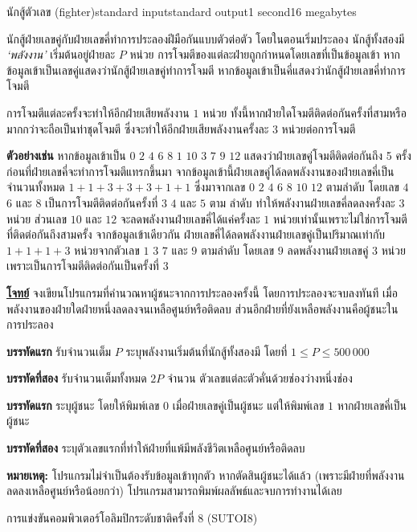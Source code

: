 \documentclass[11pt,a4paper]{article}
\begin{document}
\begin{problem}{นักสู้ตัวเลข (fighter)}{standard input}{standard output}{1 second}{16 megabytes}

นักสู้ฝ่ายเลขคู่กับฝ่ายเลขคี่ทำการประลองฝีมือกันแบบตัวต่อตัว โดยในตอนเริ่มประลอง นักสู้ทั้งสองมี \textit{‘พลังงาน’} เริ่มต้นอยู่ฝ่ายละ $P$ หน่วย การโจมตีของแต่ละฝ่ายถูกกำหนดโดยเลขที่เป็นข้อมูลเข้า หากข้อมูลเข้าเป็นเลขคู่แสดงว่านักสู้ฝ่ายเลขคู่ทำการโจมตี หากข้อมูลเข้าเป็นคี่แสดงว่านักสู้ฝ่ายเลขคี่ทำการโจมตี 

การโจมตีแต่ละครั้งจะทำให้อีกฝ่ายเสียพลังงาน $1$ หน่วย ทั้งนี้หากฝ่ายใดโจมตีติดต่อกันครั้งที่สามหรือมากกว่าจะถือเป็นท่าชุดโจมตี ซึ่งจะทำให้อีกฝ่ายเสียพลังงานครั้งละ $3$ หน่วยต่อการโจมตี

\textbf{ตัวอย่างเช่น} หากข้อมูลเข้าเป็น $0$ $2$ $4$ $6$ $8$ $1$ $10$ $3$ $7$ $9$ $12$ แสดงว่าฝ่ายเลขคู่โจมตีติดต่อกันถึง 5 ครั้งก่อนที่ฝ่ายเลขคี่จะทำการโจมตีแทรกขึ้นมา จากข้อมูลเข้านี้ฝ่ายเลขคู่ได้ลดพลังงานของฝ่ายเลขคี่เป็นจำนวนทั้งหมด $1 + 1 + 3 + 3 + 3 + 1 + 1$ ซึ่งมาจากเลข $0$ $2$ $4$ $6$ $8$ $10$ $12$ ตามลำดับ โดยเลข $4$ $6$ และ $8$ เป็นการโจมตีติดต่อกันครั้งที่ $3$ $4$ และ $5$ ตาม ลำดับ ทำให้พลังงานฝ่ายเลขคี่ลดลงครั้งละ $3$ หน่วย ส่วนเลข $10$ และ $12$ จะลดพลังงานฝ่ายเลขคี่ได้แค่ครั้งละ $1$ หน่วยเท่านั้นเพราะไม่ใช่การโจมตีที่ติดต่อกันถึงสามครั้ง จากข้อมูลเข้าเดียวกัน ฝ่ายเลขคี่ได้ลดพลังงานฝ่ายเลขคู่เป็นปริมาณเท่ากับ $1 + 1 + 1 + 3$ หน่วยจากตัวเลข $1$ $3$ $7$ และ $9$ ตามลำดับ โดยเลข $9$ ลดพลังงานฝ่ายเลขคู่ $3$ หน่วยเพราะเป็นการโจมตีติดต่อกันเป็นครั้งที่ $3$



\bigskip
\underline{\textbf{โจทย์}} จงเขียนโปรแกรมที่คำนวณหาผู้ชนะจากการประลองครั้งนี้ โดยการประลองจะจบลงทันที เมื่อพลังงานของฝ่ายใดฝ่ายหนึ่งลดลงจนเหลือศูนย์หรือติดลบ ส่วนอีกฝ่ายที่ยังเหลือพลังงานคือผู้ชนะในการประลอง


\InputFile

 \textbf{บรรทัดแรก} รับจำนวนเต็ม $P$ ระบุพลังงานเริ่มต้นที่นักสู้ทั้งสองมี โดยที่  $1 \leq P \leq 500\,000$

\textbf{บรรทัดที่สอง} รับจำนวนเต็มทั้งหมด $2P$ จำนวน ตัวเลขแต่ละตัวคั่นด้วยช่องว่างหนึ่งช่อง


\OutputFile

\textbf{บรรทัดแรก} ระบุผู้ชนะ โดยให้พิมพ์เลข $0$ เมื่อฝ่ายเลขคู่เป็นผู้ชนะ แต่ให้พิมพ์เลข $1$ หากฝ่ายเลขคี่เป็นผู้ชนะ

\textbf{บรรทัดที่สอง} ระบุตัวเลขแรกที่ทำให้ฝ่ายที่แพ้มีพลังชีวิตเหลือศูนย์หรือติดลบ

\textbf{หมายเหตุ:} โปรแกรมไม่จำเป็นต้องรับข้อมูลเข้าทุกตัว หากตัดสินผู้ชนะได้แล้ว (เพราะมีฝ่ายที่พลังงานลดลงเหลือศูนย์หรือน้อยกว่า) โปรแกรมสามารถพิมพ์ผลลัพธ์และจบการทำงานได้เลย

 

\Examples

\begin{example}
%
%
%
\end{example}


\Source

การแข่งขันคอมพิวเตอร์โอลิมปิกระดับชาติครั้งที่ 8 (SUTOI8)

\end{problem}
\end{document}
